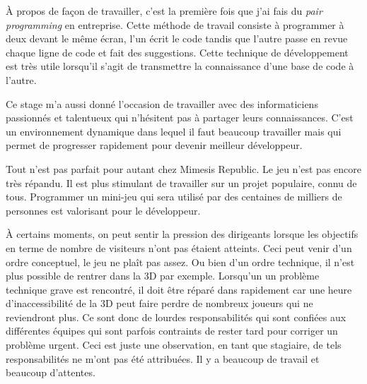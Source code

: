 À propos de façon de travailler, c'est la première fois que j'ai fais du
\textit{pair programming} en entreprise.
Cette méthode de travail consiste à programmer à deux devant le même écran,
l'un écrit le code tandis que l'autre passe en revue chaque ligne de code et
fait des suggestions. Cette technique de développement est très utile lorsqu'il
s'agit de transmettre la connaissance d'une base de code à l'autre.

Ce stage m'a aussi donné l'occasion de travailler avec des informaticiens
passionnés et talentueux qui n'hésitent pas à partager leurs connaissances.
C'est un environnement dynamique dans lequel il faut beaucoup travailler mais
qui permet de progresser rapidement pour devenir meilleur développeur.

Tout n'est pas parfait pour autant chez Mimesis Republic.
Le jeu n'est pas encore très répandu. Il est plus stimulant de travailler
sur un projet populaire, connu de tous. Programmer un mini-jeu qui sera
 utilisé par des centaines de milliers de personnes est valorisant pour le
 développeur.

À certains moments, on peut sentir la pression des dirigeants lorsque les
objectifs en terme de nombre de visiteurs n'ont pas étaient atteints.
Ceci peut venir d'un ordre conceptuel, le jeu ne plaît pas assez.
Ou bien d'un ordre technique, il n'est plus possible de rentrer dans la 3D par
exemple.
Lorsqu'un un problème technique grave est rencontré, il doit être réparé dans
rapidement car une heure d'inaccessibilité de la 3D peut faire perdre de
nombreux joueurs qui ne reviendront plus.
Ce sont donc de lourdes responsabilités qui sont confiées aux différentes
équipes qui sont parfois contraints de rester tard pour corriger un problème
urgent. Ceci est juste une observation, en tant que stagiaire, de tels
responsabilités ne m'ont pas été attribuées.
Il y a beaucoup de travail et beaucoup d'attentes.

